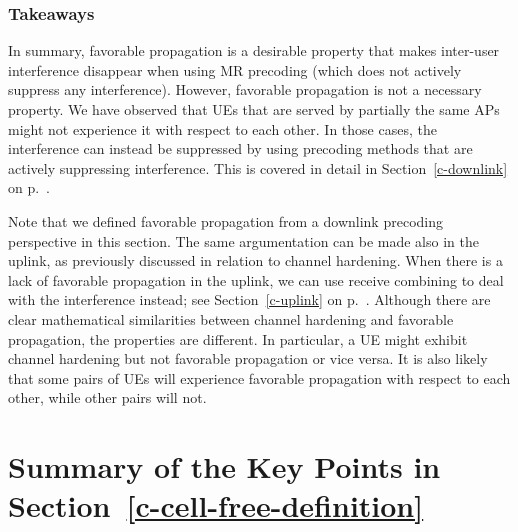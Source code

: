 \subsubsection{Takeaways}

In summary, favorable propagation is a desirable property that makes inter-user interference disappear when using MR precoding (which does not actively suppress any interference). However, favorable propagation is not a necessary property. We have observed that UEs that are served by partially the same APs might not experience it with respect to each other. In those cases, the interference can instead be suppressed by using precoding methods that are actively suppressing interference. This is covered in detail in Section~\ref{c-downlink} on p.~\pageref{c-downlink}.

Note that we defined favorable propagation from a downlink precoding perspective in this section. The same argumentation can be made also in the uplink, as previously discussed in relation to channel hardening. When there is a lack of favorable propagation in the uplink,  we can use receive combining to deal with the interference instead; see Section~\ref{c-uplink} on p.~\pageref{c-uplink}. Although there are clear mathematical similarities between channel hardening and favorable propagation, the properties are different. In particular, a UE might exhibit channel hardening but not favorable propagation or vice versa. It is also likely that some pairs of UEs will experience favorable propagation with respect to each other, while other pairs will not.





\newpage
\section{Summary of the Key Points in Section~\ref{c-cell-free-definition}}
\label{c-cell-free-definition-summary}


